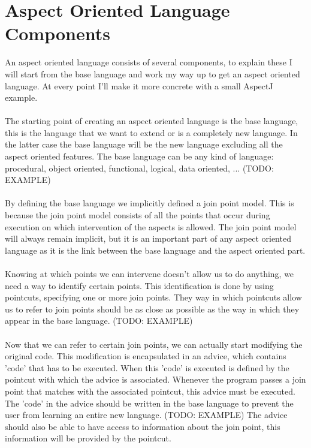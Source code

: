 \documentclass[a4paper]{report}
\begin{document}
\chapter{Aspect Oriented Language Components}
An aspect oriented language consists of several components, to explain these I will start from the base language and work my way up to get an aspect oriented language. At every point I'll make it more concrete with a small AspectJ example.\\
\\
The starting point of creating an aspect oriented language is the base language, this is the language that we want to extend or is a completely new language. In the latter case the base language will be the new language excluding all the aspect oriented features. The base language can be any kind of language: procedural, object oriented, functional, logical, data oriented, ... (TODO: EXAMPLE)\\
\\
By defining the base language we implicitly defined a join point model. This is because the join point model consists of all the points that occur during execution on which intervention of the aspects is allowed. The join point model will always remain implicit, but it is an important part of any aspect oriented language as it is the link between the base language and the aspect oriented part.\\
\\
Knowing at which points we can intervene doesn't allow us to do anything, we need a way to identify certain points. This identification is done by using pointcuts, specifying one or more join points. They way in which pointcuts allow us to refer to join points should be as close as possible as the way in which they appear in the base language. (TODO: EXAMPLE)\\
\\
Now that we can refer to certain join points, we can actually start modifying the original code. This modification is encapsulated in an advice, which contains 'code' that has to be executed. When this 'code' is executed is defined by the pointcut with which the advice is associated. Whenever the program passes a join point that matches with the associated pointcut, this advice must be executed. The 'code' in the advice should be written in the base language to prevent the user from learning an entire new language. (TODO: EXAMPLE) The advice should also be able to have access to information about the join point, this information will be provided by the pointcut.\\
\end{document}
